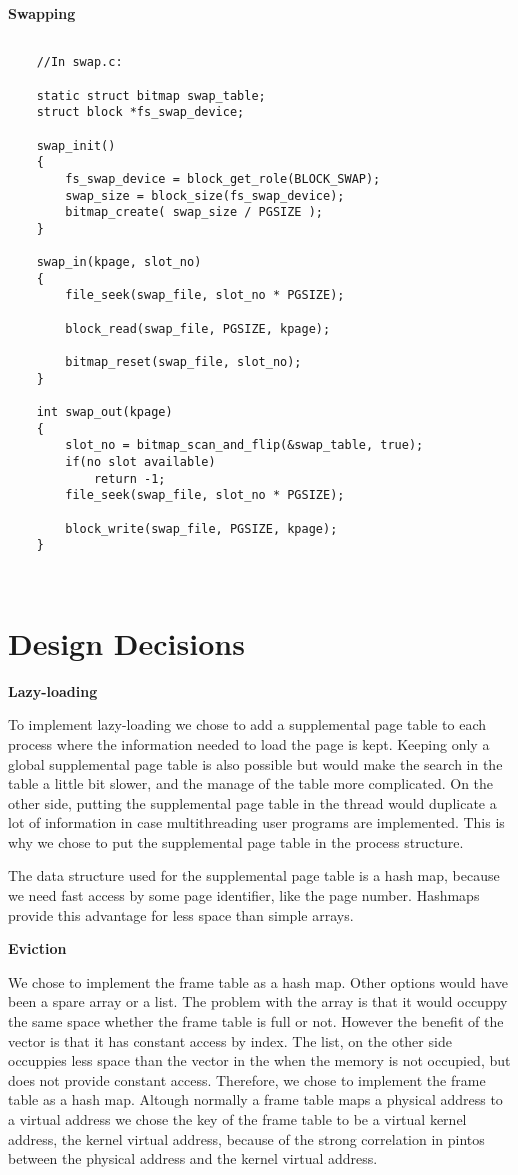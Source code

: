 \textbf{Swapping}

\begin{lstlisting}
	
	//In swap.c:
	
	static struct bitmap swap_table;
	struct block *fs_swap_device;
	
	swap_init()
	{
		fs_swap_device = block_get_role(BLOCK_SWAP);
		swap_size = block_size(fs_swap_device);
		bitmap_create( swap_size / PGSIZE );
	}
	
	swap_in(kpage, slot_no)
	{
		file_seek(swap_file, slot_no * PGSIZE);
		
		block_read(swap_file, PGSIZE, kpage);
		
		bitmap_reset(swap_file, slot_no);
	}
	
	int swap_out(kpage)
	{
		slot_no = bitmap_scan_and_flip(&swap_table, true);
		if(no slot available)
			return -1;
		file_seek(swap_file, slot_no * PGSIZE);
		
		block_write(swap_file, PGSIZE, kpage);
	}
	
\end{lstlisting}

\begin{lstlisting}

\end{lstlisting}

\section{Design Decisions}

\textbf{Lazy-loading}

To implement lazy-loading we chose to add a supplemental page table to each process where the information needed to load the page is kept. Keeping only a global supplemental page table is also possible but would make the search in the table a little bit slower, and the manage of the table more complicated.
On the other side, putting the supplemental page table in the thread would duplicate a lot of information in case multithreading user programs are implemented. This is why we chose to put the supplemental page table in the process structure.

The data structure used for the supplemental page table is a hash map, because we need fast access by some page identifier, like the page number. Hashmaps provide this advantage for less space than simple arrays.

\textbf{Eviction}

We chose to implement the frame table as a hash map. Other options would have been a spare array or a list. The problem with the array is that it would occuppy the same space whether the frame table is full or not. However the benefit of the vector is that it has constant access by index. The list, on the other side occuppies less space than the vector in the when the memory is not occupied, but does not provide constant access. Therefore, we chose to implement the frame table as a hash map.
Altough normally a frame table maps a physical address to a virtual address we chose the key of the frame table to be a virtual kernel address, the kernel virtual address, because of the strong correlation in pintos between the physical address and the kernel virtual address.

